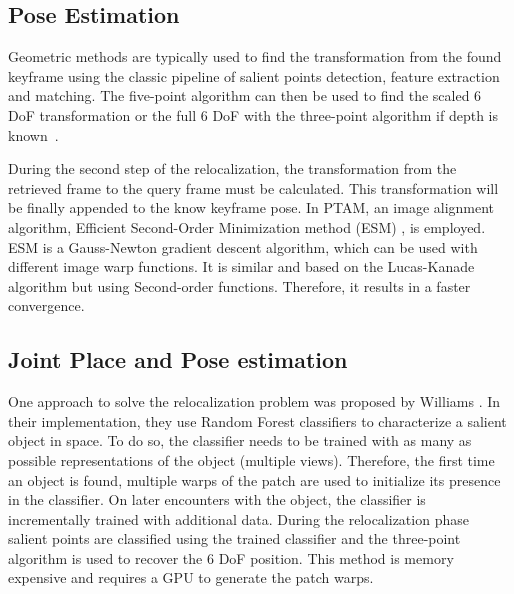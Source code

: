 \subsection{Pose Estimation}
\label{ssub:pose_estimation}

Geometric methods are typically used to find the transformation from the found keyframe using the classic pipeline of salient points detection, feature extraction and matching. The five-point algorithm can then be used to find the scaled 6 DoF transformation or the full 6 DoF with the three-point algorithm if depth is known~\cite{hartley2003multiple}.

During the second step of the relocalization, the transformation from the retrieved frame to the query frame must be calculated. This transformation will be finally appended to the know keyframe pose. In PTAM, an image alignment algorithm, Efficient Second-Order Minimization method (ESM) \cite{Benhimane2006}, is employed. ESM is a Gauss-Newton gradient descent algorithm, which can be used with different image warp functions. It is similar and based on the  Lucas-Kanade \cite{Baker2004} algorithm but using Second-order functions. Therefore, it results in a faster convergence.\\

\subsection{Joint Place and Pose estimation}
\label{ssub:joint_place_and_pose_estimaton}

One approach to solve the relocalization problem was proposed by Williams \cite{Williams2007}. In their implementation, they use Random Forest classifiers to characterize a salient object in space. To do so, the classifier needs to be trained with as many as possible representations of the object (multiple views). Therefore, the first time an object is found, multiple warps of the patch are used to initialize its presence in the classifier. On later encounters with the object, the classifier is incrementally trained with additional data. During the relocalization phase salient points are classified using the trained classifier and the three-point algorithm is used to recover the 6 DoF position. This method is memory expensive and requires a GPU to generate the patch warps.\\

